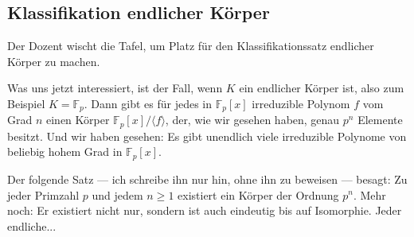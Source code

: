 \subsection{Klassifikation endlicher Körper}

\begin{meta-note}[Tafelreinigung]
Der Dozent wischt die Tafel, um Platz für den Klassifikationssatz endlicher Körper zu machen.
\end{meta-note}

\begin{spoken-clean}[01:05:39 - 01:08:19]
Was uns jetzt interessiert, ist der Fall, wenn $K$ ein endlicher Körper ist, also zum Beispiel $K = \mathbb{F}_p$. Dann gibt es für jedes in $\mathbb{F}_p[x]$ irreduzible Polynom $f$ vom Grad $n$ einen Körper $\mathbb{F}_p[x]/\langle f \rangle$, der, wie wir gesehen haben, genau $p^n$ Elemente besitzt. Und wir haben gesehen: Es gibt unendlich viele irreduzible Polynome von beliebig hohem Grad in $\mathbb{F}_p[x]$.

Der folgende Satz --- ich schreibe ihn nur hin, ohne ihn zu beweisen --- besagt: Zu jeder Primzahl $p$ und jedem $n \ge 1$ existiert ein Körper der Ordnung $p^n$. Mehr noch: Er existiert nicht nur, sondern ist auch eindeutig bis auf Isomorphie. Jeder endliche...
\end{spoken-clean}

\begin{math-stroke}

\end{math-stroke}

